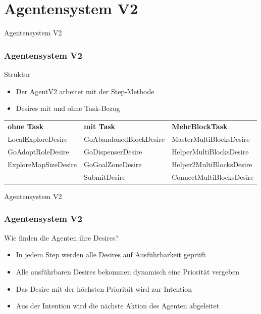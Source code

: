 \documentclass[aspectratio=169]{beamer} %
\begin{document}
\section{Agentensystem V2}
\begin{frame}{Agentensystem V2}
	\frametitle{Agentensystem V2}
	\begin{block}{Struktur}
	\end{block}
	\textbf{ }
	\begin{itemize}
		\setlength\itemsep{5mm}
		\item Der AgentV2 arbeitet mit der Step-Methode		
		\item Desires mit und ohne Task-Bezug
	\end{itemize}
	\begin{table}
	\small
	\begin{tabular}{lll}
		\textbf{ohne Task} & \textbf{mit Task} & \textbf{Mehr\-Block\-Task}\\
		LocalExploreDesire & GoAbandonedBlockDesire & MasterMultiBlocksDesire\\
		GoAdoptRoleDesire & GoDispenserDesire & HelperMultiBlocksDesire\\
		ExploreMapSizeDesire & GoGoalZoneDesire & Helper2MultiBlocksDesire\\
		& SubmitDesire & ConnectMultiBlocksDesire\\
	\end{tabular}
	\end{table}
\end{frame}

\begin{frame}{Agentensystem V2}
	\frametitle{Agentensystem V2}
	\begin{block}{Wie finden die Agenten ihre Desires?}
	\end{block}
	\textbf{ }
	\begin{itemize}
		\setlength\itemsep{5mm}
		\item In jedem Step werden alle Desires auf Ausführbarkeit geprüft		
		\item Alle ausführbaren Desires bekommen dynamisch eine Priorität vergeben
		\item Das Desire mit der höchsten Priorität wird zur Intention
		\item Aus der Intention wird die nächste Aktion des Agenten abgeleitet
	\end{itemize}
\end{frame}
\end{document}
